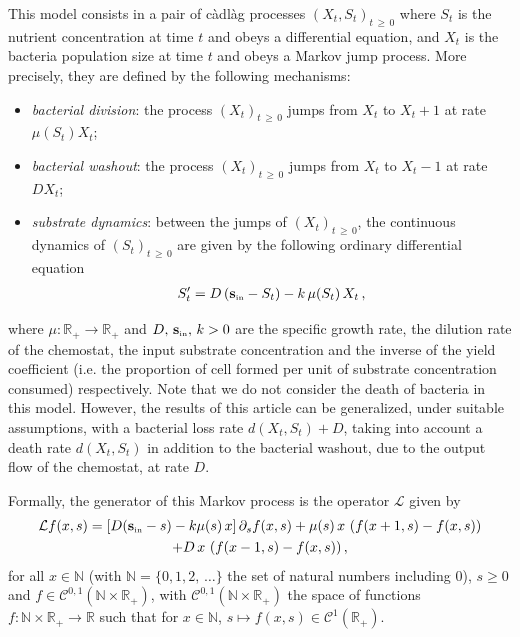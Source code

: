 \documentclass[10pt]{amsart}
\theoremstyle{definition}\newtheorem{defi}[theo]{Definition}\newtheorem{rema}[theo]{Remark}\newtheorem{exam}[theo]{Example}\newtheorem{exem}[theo]{Example}\newtheorem{nota}[theo]{Notation}
\newcommand{\RR}{\mathbb{R}}
\newcommand{\NN}{\mathbb{N}}
\newcommand{\clL}{\mathcal{L}}
\newcommand{\clC}{\mathcal{C}}
\newcommand{\Sin}{{\mathbf s}_{\textrm{\tiny\rm in}}}
\newcommand{\1}{\mathbf{1}}
\begin{document}
This model consists in a pair of càdlàg processes $(X_t,S_t)_{t\,\geq\,0}$ where $S_t$ is the nutrient concentration at time $t$ and obeys a differential equation, and $X_t$ is the bacteria population size at time $t$ and obeys a Markov jump process. More precisely, they are defined by the following mechanisms:
\begin{itemize}
\item \emph{bacterial division}: the process $(X_t)_{t\,\geq\,0}$ jumps from $X_t$ to $X_t +1$ at rate $ \mu(S_t) X_t$;
\item \emph{bacterial washout}: the process $(X_t)_{t\,\geq\,0}$ jumps from $X_t$ to $X_t -1$ at rate $ D X_t$;
\item \emph{substrate dynamics}: between the jumps of $(X_t)_{t\,\geq\,0}$, the continuous dynamics of $(S_t)_{t\,\geq\,0}$ are given by the following ordinary differential equation
\begin{align}\label{eq:substrate}
S'_t = D\,(\Sin-S_t)-k\,\mu(S_t)\, X_t \,,
\end{align}
\end{itemize}
where $\mu:\RR_+\to \RR_+$ and $D,\,\Sin,\,k>0$ are the specific growth rate, the dilution rate of the chemostat, the input substrate concentration and the inverse of the yield coefficient (i.e. the proportion of cell formed per unit of substrate concentration consumed) respectively. Note that we do not consider the death of bacteria in this model. However, the results of this article can be generalized, under suitable assumptions, with a bacterial loss rate $d(X_t, S_t)+D$, taking into account a death rate $d(X_t, S_t)$ in addition to the bacterial washout, due to the output flow of the chemostat, at rate $D$.


Formally, the generator of this Markov process is the operator $\clL$ given by
\begin{multline}\label{eq:generator}
\clL f(x,s) = \left[D(\Sin-s) - k \mu(s)\,x\right] \partial_s f(x,s) + \mu(s)\, x\, \left(f(x+1,s)-f(x,s)\right)\\
+ D \,x\,\left(f(x-1,s)-f(x,s)\right),
\end{multline}
for all $x\in\NN$ (with $\NN=\{0,1,2,\,\dots\}$ the set of natural numbers including 0), $s\geq 0$ and $f\in\clC^{0,1}(\NN\times \RR_+)$, with $\clC^{0,1}(\NN\times \RR_+)$ the space of functions $f:\NN\times \RR_+ \to \RR$ such that for $x\in\NN$, $s\mapsto f(x,s)\in \clC^{1}(\RR_+)$.
\end{document}
